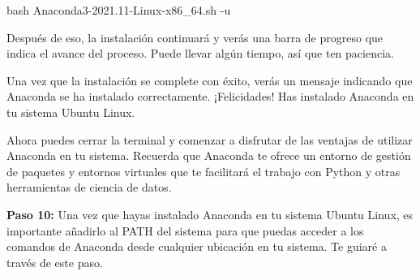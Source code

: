 \documentclass[
  jou,
  floatsintext,
  longtable,
  a4paper,
  nolmodern,
  notxfonts,
  notimes,
  colorlinks=true,linkcolor=blue,citecolor=blue,urlcolor=blue]{apa7}
\newenvironment{Shaded}{\begin{snugshade}}{\end{snugshade}}
\newcommand{\AttributeTok}[1]{\textcolor[rgb]{0.40,0.45,0.13}{#1}}
\newcommand{\FunctionTok}[1]{\textcolor[rgb]{0.28,0.35,0.67}{#1}}
\newcommand{\NormalTok}[1]{\textcolor[rgb]{0.00,0.23,0.31}{#1}}
\begin{document}
\begin{Shaded}
\begin{Highlighting}[]
\FunctionTok{bash}\NormalTok{ Anaconda3{-}2021.11{-}Linux{-}x86\_64.sh }\AttributeTok{{-}u} 
\end{Highlighting}
\end{Shaded}

Después de eso, la instalación continuará y verás una barra de progreso
que indica el avance del proceso. Puede llevar algún tiempo, así que ten
paciencia.

Una vez que la instalación se complete con éxito, verás un mensaje
indicando que Anaconda se ha instalado correctamente. ¡Felicidades! Has
instalado Anaconda en tu sistema Ubuntu Linux.

Ahora puedes cerrar la terminal y comenzar a disfrutar de las ventajas
de utilizar Anaconda en tu sistema. Recuerda que Anaconda te ofrece un
entorno de gestión de paquetes y entornos virtuales que te facilitará el
trabajo con Python y otras herramientas de ciencia de datos.

\textbf{Paso 10:} Una vez que hayas instalado Anaconda en tu sistema
Ubuntu Linux, es importante añadirlo al PATH del sistema para que puedas
acceder a los comandos de Anaconda desde cualquier ubicación en tu
sistema. Te guiaré a través de este paso.
\end{document}
